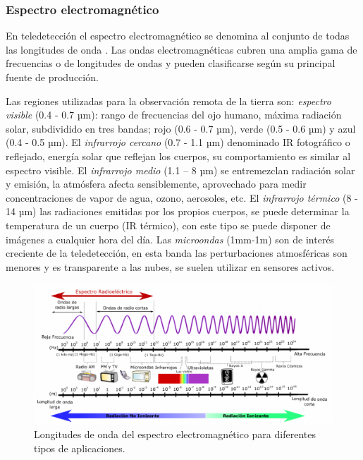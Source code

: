 \subsubsection{Espectro electromagnético}

En teledetección el espectro electromagnético se denomina al conjunto de todas las longitudes de onda \citep{chuvieco}. Las ondas electromagnéticas cubren una amplia gama de frecuencias o de longitudes de ondas y pueden clasificarse según su principal fuente de producción. 

Las regiones utilizadas para la observación remota de la tierra son: \textit{espectro visible} (0.4 - 0.7 µm): rango de frecuencias del ojo humano, máxima radiación solar, subdividido en tres bandas; rojo (0.6 - 0.7 µm), verde (0.5 - 0.6 µm) y azul (0.4 - 0.5 µm). El \textit{infrarrojo cercano} (0.7 - 1.1 µm) denominado IR fotográfico o reflejado, energía solar que reflejan los cuerpos, su comportamiento es similar al espectro visible. El \textit{infrarrojo medio} (1.1 – 8 µm) se entremezclan radiación solar y emisión, la atmósfera afecta sensiblemente, aprovechado para medir concentraciones de vapor de agua, ozono, aerosoles, etc. El \textit{infrarrojo térmico} (8 - 14 µm) las radiaciones emitidas por los propios cuerpos, se puede determinar la temperatura de un cuerpo (IR térmico), con este tipo se puede disponer de imágenes a cualquier hora del día. Las \textit{microondas} (1mm-1m) son de interés creciente de la teledetección, en esta banda las perturbaciones atmosféricas son menores y es transparente a las nubes, se suelen utilizar en sensores activos. 


\begin{figure}[H] \centering
  \includegraphics[scale=0.5,keepaspectratio=true,clip=true]{imagenes/MarcoTeorico/espectro-electro.png}
  \caption{Longitudes de onda del espectro electromagnético para diferentes tipos de aplicaciones.}\label{Fig:espectro-electromagnetico}
\end{figure}



